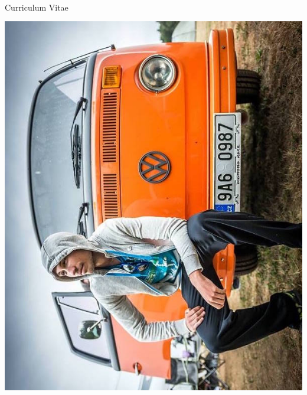 \documentclass[10pt]{article} %
\begin{document}
\color{text1} %


\par{\\
\medskip 
{ Curriculum Vitae \\[-50pt]\par}
	
\begin{minipage}[t]{0.5\textwidth}%
\vspace{0pt}%
\begin{minipage}[b]{0.30\textwidth} %
\includegraphics[width=\textwidth]{figures/profile.jpg}
\end{minipage}

\end{minipage}}
\end{document}
